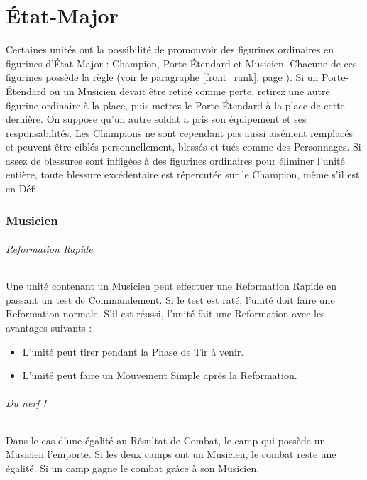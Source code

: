 
\hypertarget{commandgroup}{\part{État-Major}}
\label{command_group}

Certaines unités ont la possibilité de promouvoir des figurines ordinaires en figurines d'État-Major : Champion, Porte-Étendard et Musicien. Chacune de ces figurines possède la règle \newfromWHB{\frontrank} (voir le paragraphe \ref{front_rank}, page \pageref{front_rank}). Si un Porte-Étendard ou un Musicien devait être retiré comme perte, retirez une autre figurine ordinaire à la place, puis mettez le Porte-Étendard à la place de cette dernière. On suppose qu'un autre soldat a pris son équipement et ses responsabilités. Les Champions ne sont cependant pas aussi aisément remplacés et peuvent être ciblés personnellement, blessés et tués comme des Personnages. Si assez de blessures sont infligées à des figurines ordinaires pour éliminer l'unité entière, toute blessure excédentaire est répercutée sur le Champion, même s'il est en Défi.

\section{Musicien}
\label{musician}

\paragraph{Reformation Rapide}

Une unité contenant un Musicien peut effectuer une Reformation Rapide en passant un test de Commandement. Si le test est raté, l'unité doit faire une Reformation normale. S'il est réussi, l'unité fait une Reformation avec les avantages suivants :
\begin{itemize}[label={-}]
\item L'unité peut tirer pendant la Phase de Tir à venir.
\item L'unité peut faire un Mouvement Simple après la Reformation.
\end{itemize}

\paragraph{Du nerf !}

Dans le cas d'une égalité au Résultat de Combat, le camp qui possède un Musicien l'emporte. Si les deux camps ont un Musicien, le combat reste une égalité. Si un camp gagne le combat grâce à son Musicien, 

